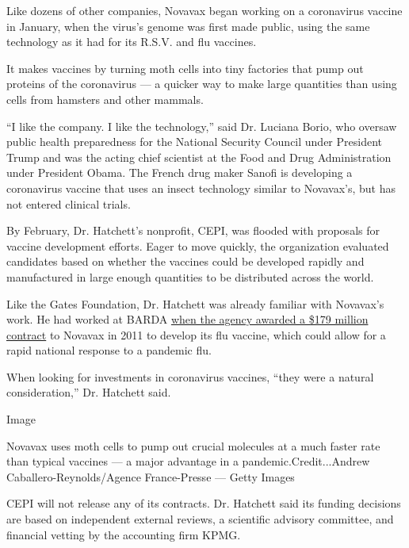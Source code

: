 Like dozens of other companies, Novavax began working on a coronavirus
vaccine in January, when the virus's genome was first made public, using
the same technology as it had for its R.S.V. and flu vaccines.

It makes vaccines by turning moth cells into tiny factories that pump
out proteins of the coronavirus --- a quicker way to make large
quantities than using cells from hamsters and other mammals.

``I like the company. I like the technology,'' said Dr. Luciana Borio,
who oversaw public health preparedness for the National Security Council
under President Trump and was the acting chief scientist at the Food and
Drug Administration under President Obama. The French drug maker Sanofi
is developing a coronavirus vaccine that uses an insect technology
similar to Novavax's, but has not entered clinical trials.

By February, Dr. Hatchett's nonprofit, CEPI, was flooded with proposals
for vaccine development efforts. Eager to move quickly, the organization
evaluated candidates based on whether the vaccines could be developed
rapidly and manufactured in large enough quantities to be distributed
across the world.

Like the Gates Foundation, Dr. Hatchett was already familiar with
Novavax's work. He had worked at BARDA
\href{https://www.prnewswire.com/news-releases/novavax-awarded-hhs-barda-contract-valued-at-up-to-179-million-to-develop-pandemic-and-seasonal-influenza-vaccines-for-us-government-using-recombinant-vlp-technology-117145058.html}{when
the agency awarded a \$179 million contract} to Novavax in 2011 to
develop its flu vaccine, which could allow for a rapid national response
to a pandemic flu.

When looking for investments in coronavirus vaccines, ``they were a
natural consideration,'' Dr. Hatchett said.

Image

Novavax uses moth cells to pump out crucial molecules at a much faster
rate than typical vaccines --- a major advantage in a
pandemic.Credit...Andrew Caballero-Reynolds/Agence France-Presse ---
Getty Images

CEPI will not release any of its contracts. Dr. Hatchett said its
funding decisions are based on independent external reviews, a
scientific advisory committee, and financial vetting by the accounting
firm KPMG.

\href{https://www.nytimes3xbfgragh.onion/news-event/coronavirus?action=click\&pgtype=Article\&state=default\&region=MAIN_CONTENT_3\&context=storylines_faq}{}

